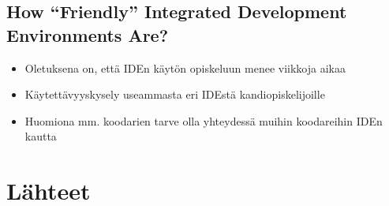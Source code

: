 \documentclass[11pt]{article}
\begin{document}
\subsection{How ``Friendly'' Integrated Development Environments Are?}
\begin{itemize}
\item Oletuksena on, että IDEn käytön opiskeluun menee viikkoja aikaa
\item Käytettävyyskysely useammasta eri IDEstä kandiopiskelijoille
\item Huomiona mm. koodarien tarve olla yhteydessä muihin koodareihin
  IDEn kautta
\end{itemize}

\section{Lähteet}
\label{sec:orgb7e844c}
\end{document}
